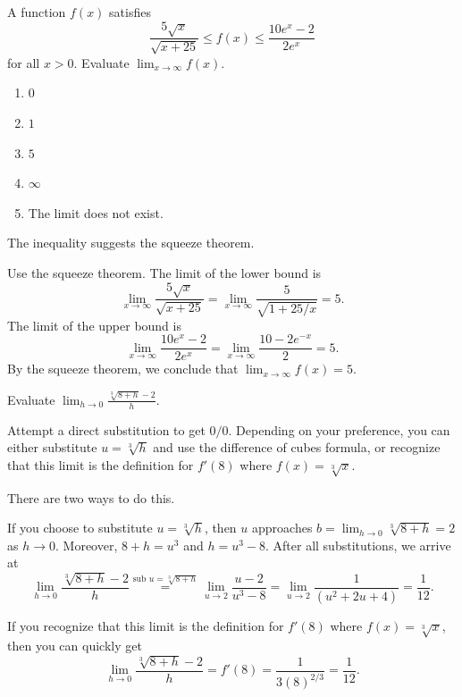 \documentclass[../main.tex]{subfiles}
\begin{document}
\begin{exercise}
  A function \(f(x)\) satisfies
  \[
    \frac{5 \sqrt{x}}{\sqrt{x + 25}} \le f(x) \le \frac{10 e^{x} - 2}{2 e^{x}}
  \]
  for all \(x > 0\). Evaluate \(\lim_{x \to \infty} f(x)\).

  \begin{enumerate}[label=\Alph*.]
    \item \(0\)
    \item \(1\)
    \item \(5\)
    \item \(\infty\)
    \item The limit does not exist.
  \end{enumerate}

  \begin{hint}
    The inequality suggests the squeeze theorem.
  \end{hint}
  \begin{solution}
    Use the squeeze theorem. The limit of the lower bound is
    \[
      \lim_{x \to \infty} \frac{5 \sqrt{x}}{\sqrt{x + 25}} = \lim_{x \to \infty} \frac{5}{\sqrt{1 + 25/x}} = 5.
    \]
    The limit of the upper bound is
    \[
      \lim_{x \to \infty} \frac{10 e^{x} - 2}{2 e^{x}} = \lim_{x \to \infty} \frac{10 - 2 e^{-x}}{2} = 5.
    \]
    By the squeeze theorem, we conclude that \(\lim_{x \to \infty} f(x) = 5\).
  \end{solution}
\end{exercise}
\nopagebreak\vfill

\begin{exercise} \label{ex:change-of-variable-cube-at-8-shifted}
  Evaluate \(\lim_{h \to 0} \frac{\sqrt[3]{8 + h} - 2}{h}\).

  \begin{hint}
    Attempt a direct substitution to get \(0/0\). Depending on your preference, you can either substitute \(u = \sqrt[3]{h}\) and use the difference of cubes formula, or recognize that this limit is the definition for \(f'(8)\) where \(f(x) = \sqrt[3]{x}\).
  \end{hint}
  \begin{solution}
    There are two ways to do this.
    
    If you choose to substitute \(u = \sqrt[3]{h}\), then \(u\) approaches \(b = \lim_{h \to 0} \sqrt[3]{8 + h} = 2\) as \(h \to 0\). Moreover, \(8 + h = u^{3}\) and \(h = u^{3} - 8\). After all substitutions, we arrive at
    \[
      \lim_{h \to 0} \frac{\sqrt[3]{8 + h} - 2}{h} \overset{\text{sub \(u = \sqrt[3]{8 + h}\)}}{=} \lim_{u \to 2} \frac{u - 2}{u^{3} - 8} = \lim_{u \to 2} \frac{1}{(u^{2} + 2u + 4)} = \frac{1}{12}.
    \]
    
    If you recognize that this limit is the definition for \(f'(8)\) where \(f(x) = \sqrt[3]{x}\), then you can quickly get
    \[
      \lim_{h \to 0} \frac{\sqrt[3]{8 + h} - 2}{h} = f'(8) = \frac{1}{3(8)^{2/3}} = \frac{1}{12}.
    \]
  \end{solution}
\end{exercise}
\nopagebreak\vfill
\end{document}
